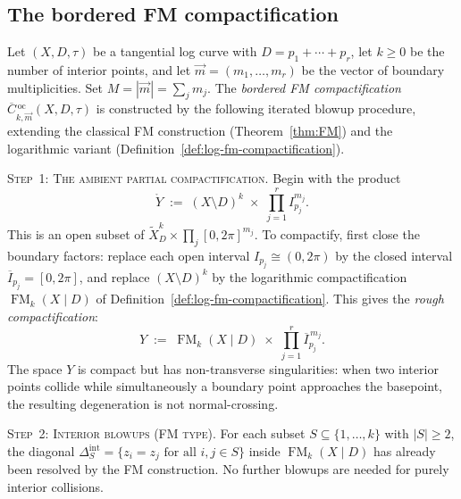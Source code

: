 \subsection{The bordered FM compactification}
\label{subsec:bordered-fm-construction}

\begin{construction}
\label{constr:bordered-fm}
Let $(X, D, \tau)$ be a tangential log curve with
$D = p_1 + \cdots + p_r$, let $k \geq 0$ be the number of
interior points, and let $\vec{m} = (m_1, \ldots, m_r)$ be the
vector of boundary multiplicities.  Set $M = |\vec{m}| = \sum_j m_j$.
The \emph{bordered FM compactification}
$\overline{C}{}^{\,\mathrm{oc}}_{k,\vec{m}}(X, D, \tau)$ is
constructed by the following iterated blowup procedure,
extending the classical FM construction
(Theorem~\ref{thm:FM}) and the logarithmic variant
(Definition~\ref{def:log-fm-compactification}).

\medskip
\noindent\textsc{Step~1: The ambient partial compactification.}
Begin with the product
\begin{equation}\label{eq:bordered-ambient}
\mathring{Y}
\;:=\;
(X \setminus D)^k
\;\times\;
\prod_{j=1}^{r}
I_{p_j}^{m_j}.
\end{equation}
This is an open subset of
$\widetilde{X}_D^k \times \prod_j [0, 2\pi]^{m_j}$.  To
compactify, first close the boundary factors: replace each open
interval $I_{p_j} \cong (0, 2\pi)$ by the closed interval
$\overline{I}_{p_j} = [0, 2\pi]$, and replace $(X \setminus D)^k$
by the logarithmic compactification
$\operatorname{FM}_k(X \mathbin{|} D)$ of
Definition~\ref{def:log-fm-compactification}.  This gives the
\emph{rough compactification}:
\begin{equation}\label{eq:bordered-rough}
Y
\;:=\;
\operatorname{FM}_k(X \mathbin{|} D)
\;\times\;
\prod_{j=1}^{r}
\overline{I}_{p_j}^{\,m_j}.
\end{equation}
The space $Y$ is compact but has non-transverse singularities: when
two interior points collide while simultaneously a boundary point
approaches the basepoint, the resulting degeneration is not
normal-crossing.

\medskip
\noindent\textsc{Step~2: Interior blowups (FM type).}
For each subset $S \subseteq \{1, \ldots, k\}$ with $|S| \geq 2$,
the diagonal $\Delta_S^{\mathrm{int}}
= \{z_i = z_j \text{ for all } i, j \in S\}$ inside
$\operatorname{FM}_k(X \mathbin{|} D)$ has already been resolved
by the FM construction.  No further blowups are needed for purely
interior collisions.


\end{construction}
